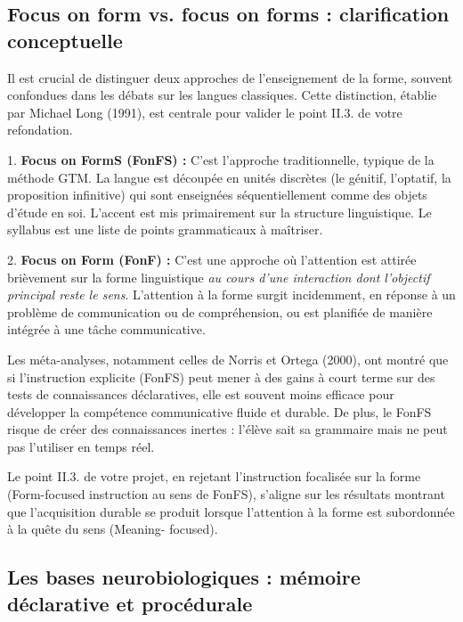 \subsection{Focus on form vs. focus on forms : clarification conceptuelle}

Il est crucial de distinguer deux approches de l'enseignement de la forme, souvent confondues dans
les débats sur les langues classiques. Cette distinction, établie par Michael Long (1991), est
centrale pour valider le point II.3.\cite{II-3-3-ref3} de votre refondation.

1. \textbf{Focus on FormS (FonFS) :} C'est l'approche traditionnelle, typique de la méthode GTM. La
langue est découpée en unités discrètes (le génitif, l'optatif, la proposition infinitive) qui sont
enseignées séquentiellement comme des objets d'étude en soi. L'accent est mis primairement sur la
structure linguistique. Le \og syllabus\fg{} est une liste de points grammaticaux à
maîtriser.\cite{II-3-3-ref11}

2. \textbf{Focus on Form (FonF) :} C'est une approche où l'attention est attirée brièvement sur la
forme linguistique \textit{au cours d'une interaction dont l'objectif principal reste le sens}.
L'attention à la forme surgit incidemment, en réponse à un problème de communication ou de
compréhension, ou est planifiée de manière intégrée à une tâche communicative.\cite{II-3-3-ref11}

Les méta-analyses, notamment celles de Norris et Ortega (2000), ont montré que si l'instruction
explicite (FonFS) peut mener à des gains à court terme sur des tests de connaissances déclaratives,
elle est souvent moins efficace pour développer la compétence communicative fluide et
durable.\cite{II-3-3-ref12} De plus, le FonFS risque de créer des connaissances inertes : l'élève
\og sait\fg{} sa grammaire mais ne peut pas l'utiliser en temps réel.

Le point II.3.\cite{II-3-3-ref3} de votre projet, en rejetant l'instruction focalisée sur la forme
(Form-focused instruction au sens de FonFS), s'aligne sur les résultats montrant que l'acquisition
durable se produit lorsque l'attention à la forme est subordonnée à la quête du sens (Meaning-
focused).\cite{II-3-3-ref15}



\subsection{Les bases neurobiologiques : mémoire déclarative et procédurale}

